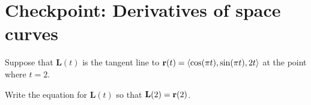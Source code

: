 


%


\allowdisplaybreaks
\section{Checkpoint: Derivatives of space curves}

    Suppose that $\mathbf{L}(t)$ is the tangent line to $\mathbf{r}(t) = \langle\cos(\pi t), \sin(\pi t), 2t\rangle$ at the point where $t=2$.

    Write the equation for $\mathbf{L}(t)$ so that $\mathbf{L}(2) = \mathbf{r}(2)$.




	
